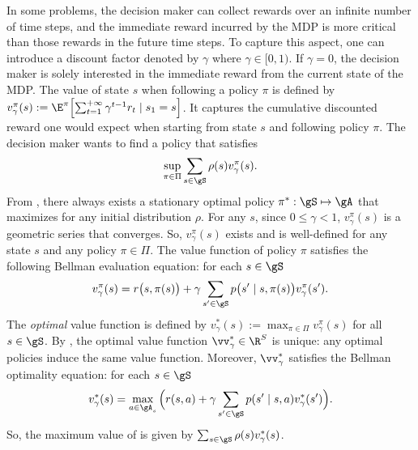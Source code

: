 In some problems, the decision maker can collect rewards over an infinite number of time steps, and the immediate reward incurred by the MDP is more critical than those rewards in the future time steps.
To capture this aspect, one can introduce a discount factor denoted by $\gamma$ where $\gamma\in[0,1)$.
If $\gamma=0$, the decision maker is solely interested in the immediate reward from the current state of the MDP.
The value of state $s$ when following a policy $\pi$ is defined by $v^\pi_{\gamma}(s):=\E^\pi\Bigl[\sum_{t=1}^{+\infty} \gamma^{t-1}r_t \mid s_1=s\Bigr]$.
It captures the cumulative discounted reward one would expect when starting from state $s$ and following policy $\pi$.
The decision maker wants to find a policy that satisfies
\begin{equation}
    \label{eq:discount_obj}
    \sup_{\pi\in\Pi}\sum_{s\in\gS}\rho(s)v^\pi_{\gamma}(s).
\end{equation}
From \cite[Chapter~6]{puterman2014markov}, there always exists a stationary optimal policy $\pi^*:\gS\mapsto\gA$ that maximizes  for any initial distribution $\rho$.
For any $s$, since $0\le\gamma<1$, $v_\gamma^\pi(s)$ is a geometric series that converges.
So, $v^\pi_\gamma(s)$ exists and is well-defined for any state $s$ and any policy $\pi\in\Pi$.
The value function of policy $\pi$ satisfies the following Bellman evaluation equation: for each $s\in\gS$
\begin{equation}
    \label{eq:discount_be_eval}
    v^\pi_\gamma(s) =r\bigl(s,\pi(s)\bigr) +\gamma\sum_{s'\in\gS}p\bigl(s'\mid s,\pi(s)\bigr)v^\pi_\gamma(s').
\end{equation}
The \emph{optimal} value function is defined by $v^*_\gamma(s):=\max_{\pi\in\Pi}v^\pi_\gamma(s)$ for all $s\in\gS$.
By \cite[Theorem~6.2.5]{puterman2014markov}, the optimal value function $\vv^*_\gamma\in\R^{S}$ is unique: any optimal policies induce the same value function.
Moreover, $\vv^*_\gamma$ satisfies the Bellman optimality equation: for each $s\in\gS$
\begin{equation}
    \label{eq:discount_be_opt}
     v^*_\gamma(s)= \max_{a\in\gA_s}\Big(r(s, a) +\gamma\sum_{s'\in\gS}p(s'\mid s,a)v^*_\gamma(s')\Big).
\end{equation}
So, the maximum value of  is given by $\sum_{s\in\gS}\rho(s)v^*_\gamma(s)$.


